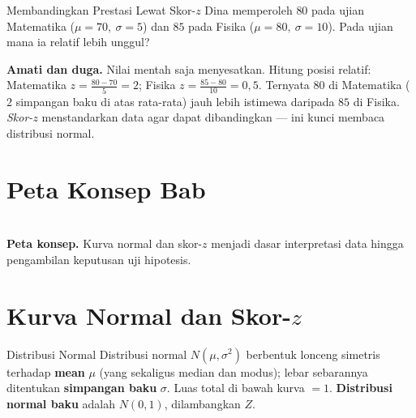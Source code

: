 \documentclass[11pt,a4paper]{report}
\theoremstyle{gaya}
\begin{document}
\begin{studikasus}{Membandingkan Prestasi Lewat Skor-$z$}
Dina memperoleh $80$ pada ujian Matematika ($\mu=70,\ \sigma=5$) dan $85$ pada Fisika ($\mu=80,\ \sigma=10$). Pada ujian mana ia relatif lebih unggul?
\smallskip

\textbf{Amati dan duga.} Nilai mentah saja menyesatkan. Hitung posisi relatif: Matematika $z=\tfrac{80-70}{5}=2$; Fisika $z=\tfrac{85-80}{10}=0{,}5$. Ternyata $80$ di Matematika ($2$ simpangan baku di atas rata-rata) jauh lebih istimewa daripada $85$ di Fisika. \emph{Skor-$z$} menstandarkan data agar dapat dibandingkan --- ini kunci membaca distribusi normal.
\end{studikasus}

\section*{Peta Konsep Bab}
\begin{center}
\\
\small \textbf{Peta konsep.} Kurva normal dan skor-$z$ menjadi dasar interpretasi data hingga pengambilan keputusan uji hipotesis.
\end{center}

\section{Kurva Normal dan Skor-$z$}
\begin{konsep}{Distribusi Normal}
Distribusi normal $N(\mu,\sigma^2)$ berbentuk lonceng simetris terhadap \textbf{mean} $\mu$ (yang sekaligus median dan modus); lebar sebarannya ditentukan \textbf{simpangan baku} $\sigma$. Luas total di bawah kurva $=1$. \textbf{Distribusi normal baku} adalah $N(0,1)$, dilambangkan $Z$.
\end{konsep}
\end{document}
